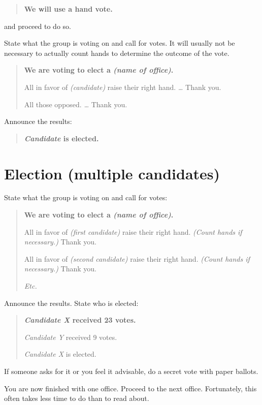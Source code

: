 \documentclass{article}
\newenvironment{chairsays}
               {\parskip 0pt \par %
                \begin{quote}
                 \parskip 0pt \bf}
               {\end{quote}}
\begin{document}
\begin{chairsays}
We will use a hand vote.
\end{chairsays}
and proceed to do so.

State what the group is voting on and call for votes.  It will usually
not be necessary to actually count hands to determine the outcome of
the vote.

\begin{chairsays}
We are voting to elect a {\em (name of office)}.

All in favor of {\em (candidate)\/} raise their right hand.
{\em \ldots}
Thank you.

All those opposed.
{\em \ldots}
Thank you.
\end{chairsays}

Announce the results:

\begin{chairsays}
{\em Candidate\/} is elected.
\end{chairsays}

\pagebreak[3]

\section{Election (multiple candidates)}

State what the group is voting on and call for votes:

\begin{chairsays}
We are voting to elect a {\em (name of office)}.

All in favor of {\em (first candidate)\/} raise their right hand.
{\em (Count hands if necessary.)}
Thank you.

All in favor of {\em (second candidate)\/} raise their right hand.
{\em (Count hands if necessary.)}
Thank you.

{\em Etc.}
\end{chairsays}

Announce the results.  State who is elected:

\begin{chairsays}
{\em Candidate X\/} received 23 votes.

{\em Candidate Y\/} received 9 votes.

{\em Candidate X\/} is elected.
\end{chairsays}

If someone asks for it or you feel it advisable, do a secret vote with
paper ballots.

You are now finished with one office.  Proceed to the next office.
Fortunately, this often takes less time to do than to read about.
\end{document}
